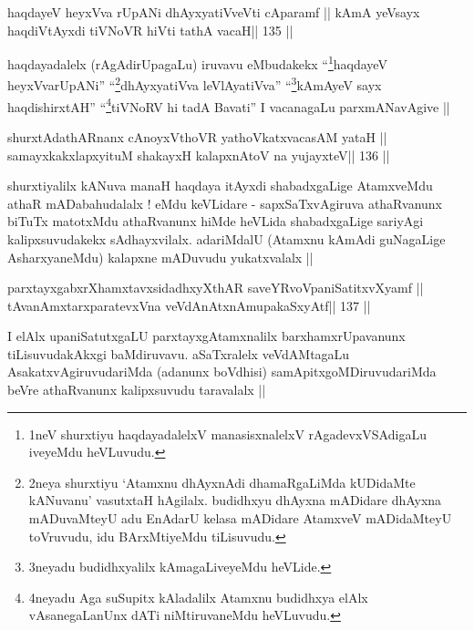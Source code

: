 \begin{shl}
haqdayeV heyxVva rUpANi dhAyxyatiVveVti cAparamf ||
kAmA yeV\s sayx haqdiVtAyxdi tiVNoVR hiVti tathA vacaH\hfill || 135 ||
\end{shl}

\begin{artha}
haqdayadalelx (rAgAdirUpagaLu) iruvavu
eMbudakekx ``\footnote[1]{1neV shurxtiyu haqdayadalelxV manasisxnalelxV
  rAgadevxVSAdigaLu iveyeMdu heVLuvudu.}haqdayeV heyxVvarUpANi''
``\footnote[2]{2neya shurxtiyu `Atamxnu dhAyxnAdi dhamaRgaLiMda
  kUDidaMte kANuvanu' vasutxtaH hAgilalx. budidhxyu dhAyxna mADidare
  dhAyxna mADuvaMteyU adu EnAdarU kelasa mADidare AtamxveV mADidaMteyU
  toVruvudu, idu BArxMtiyeMdu tiLisuvudu.}dhAyxyatiVva leVlAyatiVva''
``\footnote[3]{3neyadu budidhxyalilx kAmagaLiveyeMdu heVLide.}kAmAyeV\s
sayx haqdishirxtAH'' ``\footnote[4]{4neyadu Aga suSupitx kAladalilx
  Atamxnu budidhxya elAlx vAsanegaLanUnx dATi niMtiruvaneMdu 
  heVLuvudu.}tiVNoRV hi tadA Bavati'' I vacanagaLu
parxmANavAgive ||
\end{artha}

\begin{shl}
shurxtAdathARnanx cAnoyxV\s thoVR yathoVkatxvacasAM yataH ||
samayxkakxlapxyituM shakayxH kalapxnA\s toV na yujayxteV\hfill || 136 ||
\end{shl}

\begin{artha}
shurxtiyalilx kANuva manaH haqdaya itAyxdi shabadxgaLige AtamxveMdu
  athaR mADabahudalalx ! eMdu keVLidare - sapxSaTxvAgiruva athaRvanunx
  biTuTx matotxMdu athaRvanunx hiMde heVLida shabadxgaLige sariyAgi
  kalipxsuvudakekx sAdhayxvilalx. adariMdalU (Atamxnu kAmAdi guNagaLige
  AsharxyaneMdu) kalapxne mADuvudu yukatxvalalx ||
\end{artha}


\begin{shl}
parxtayxgabxrXhamxtavxsidadhxyXthAR saveYRvoVpaniSatitxvXyamf ||
tAvanAmxtarxparatevxVna veVdAnAtxnAmupakaSxyAtf\hfill || 137 ||
\end{shl}

\begin{artha}
I elAlx upaniSatutxgaLU parxtayxgAtamxnalilx barxhamxrUpavanunx
tiLisuvudakAkxgi baMdiruvavu. aSaTxralelx veVdAMtagaLu
AsakatxvAgiruvudariMda (adanunx boVdhisi) samApitxgoMDiruvudariMda
beVre athaRvanunx kalipxsuvudu taravalalx ||
\end{artha}

